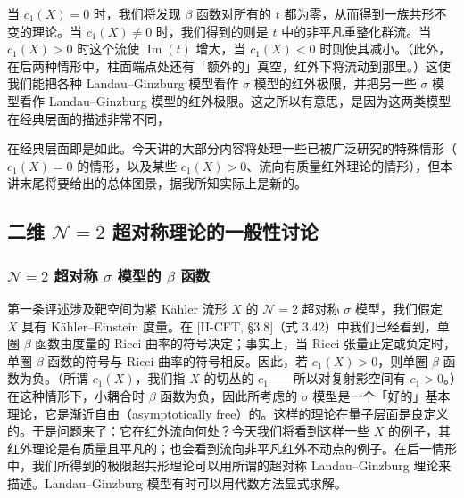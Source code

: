 当 $c_1(X)=0$ 时，我们将发现 $\beta$ 函数对所有的 $t$ 都为零，从而得到一族共形不变的理论。当 $c_1(X)\neq0$ 时，我们得到的则是 $t$ 中的非平凡重整化群流。当 $c_1(X)>0$ 时这个流使 $\operatorname{Im}(t)$ 增大，当 $c_1(X)<0$ 时则使其减小。（此外，在后两种情形中，柱面端点处还有「额外的」真空，红外下将流动到那里。）这使我们能把各种 Landau--Ginzburg 模型看作 $\sigma$ 模型的红外极限，并把另一些 $\sigma$ 模型看作 Landau--Ginzburg 模型的红外极限。这之所以有意思，是因为这两类模型在经典层面的描述非常不同，


在经典层面即是如此。今天讲的大部分内容将处理一些已被广泛研究的特殊情形（$c_1(X)=0$ 的情形，以及某些 $c_1(X)>0$、流向有质量红外理论的情形），但本讲末尾将要给出的总体图景，据我所知实际上是新的。

\subsection{二维 $\mathcal{N}=2$ 超对称理论的一般性讨论}

\subsubsection{$\mathcal{N}=2$ 超对称 $\sigma$ 模型的 $\beta$ 函数}

第一条评述涉及靶空间为紧 Kähler 流形 $X$ 的 $\mathcal{N}=2$ 超对称 $\sigma$ 模型，我们假定 $X$ 具有 Kähler--Einstein 度量。在 [II-CFT, §3.8]（式 3.42）中我们已经看到，单圈 $\beta$ 函数由度量的 Ricci 曲率的符号决定；事实上，当 Ricci 张量正定或负定时，单圈 $\beta$ 函数的符号与 Ricci 曲率的符号相反。因此，若 $c_1(X)>0$，则单圈 $\beta$ 函数为负。（所谓 $c_1(X)$，我们指 $X$ 的切丛的 $c_1$——所以对复射影空间有 $c_1>0$。）在这种情形下，小耦合时 $\beta$ 函数为负，因此所考虑的 $\sigma$ 模型是一个「好的」基本理论，它是渐近自由（asymptotically free）的。这样的理论在量子层面是良定义的。于是问题来了：它在红外流向何处？今天我们将看到这样一些 $X$ 的例子，其红外理论是有质量且平凡的；也会看到流向非平凡红外不动点的例子。在后一情形中，我们所得到的极限超共形理论可以用所谓的超对称 Landau--Ginzburg 理论来描述。Landau--Ginzburg 模型有时可以用代数方法显式求解。


